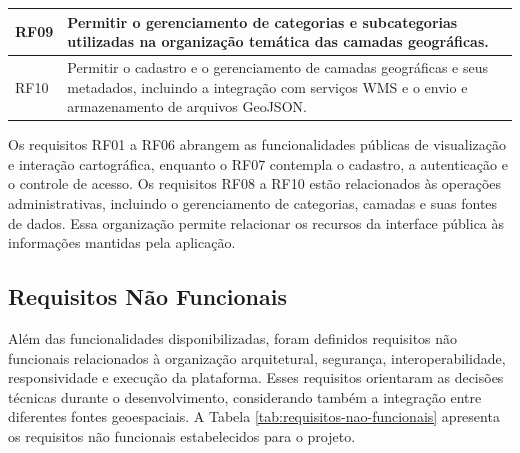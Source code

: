 \begin{table}[!htbp]
{\begin{tabular}{
            >{\raggedright\arraybackslash}p{1.5cm}
            >{\raggedright\arraybackslash}p{12.9cm}
        }
            RF09 &
            Permitir o gerenciamento de categorias e subcategorias utilizadas na organização temática das camadas geográficas. \\
            \midrule

            RF10 &
            Permitir o cadastro e o gerenciamento de camadas geográficas e seus metadados, incluindo a integração com serviços WMS e o envio e armazenamento de arquivos GeoJSON. \\

            \bottomrule
        \end{tabular}
    }{
    }
\end{table}

Os requisitos RF01 a RF06 abrangem as funcionalidades públicas de visualização e interação cartográfica, enquanto o RF07 contempla o cadastro, a autenticação e o controle de acesso. Os requisitos RF08 a RF10 estão relacionados às operações administrativas, incluindo o gerenciamento de categorias, camadas e suas fontes de dados. Essa organização permite relacionar os recursos da interface pública às informações mantidas pela aplicação.

\FloatBarrier
\subsection{Requisitos Não Funcionais}
\label{sec:requisitos-nao-funcionais}

Além das funcionalidades disponibilizadas, foram definidos requisitos não funcionais relacionados à organização arquitetural, segurança, interoperabilidade, responsividade e execução da plataforma. Esses requisitos orientaram as decisões técnicas durante o desenvolvimento, considerando também a integração entre diferentes fontes geoespaciais. A Tabela \ref{tab:requisitos-nao-funcionais} apresenta os requisitos não funcionais estabelecidos para o projeto.

